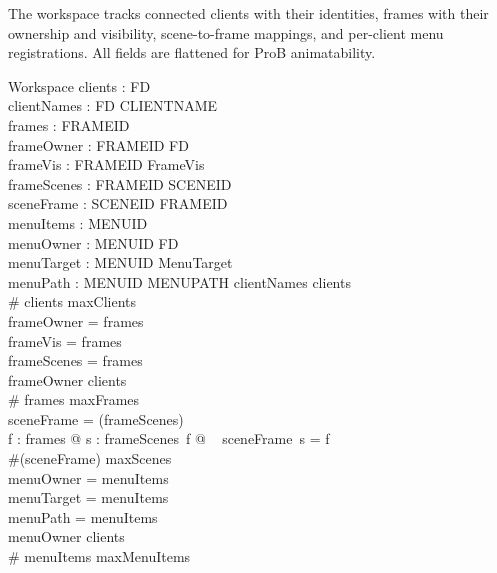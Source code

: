 \documentclass[a4paper,10pt,fleqn]{article}
\begin{document}
The workspace tracks connected clients with their identities,
frames with their ownership and visibility, scene-to-frame
mappings, and per-client menu registrations.  All fields are
flattened for ProB animatability.

\begin{schema}{Workspace}
  clients : \power FD \\
  clientNames : FD \pfun CLIENTNAME \\
  frames : \power FRAMEID \\
  frameOwner : FRAMEID \pfun FD \\
  frameVis : FRAMEID \pfun FrameVis \\
  frameScenes : FRAMEID \pfun \power SCENEID \\
  sceneFrame : SCENEID \pfun FRAMEID \\
  menuItems : \power MENUID \\
  menuOwner : MENUID \pfun FD \\
  menuTarget : MENUID \pfun MenuTarget \\
  menuPath : MENUID \pfun MENUPATH
  \where
  \dom clientNames \subseteq clients \\
  \# clients \leq maxClients \\
  \dom frameOwner = frames \\
  \dom frameVis = frames \\
  \dom frameScenes = frames \\
  \ran frameOwner \subseteq clients \\
  \# frames \leq maxFrames \\
  \dom sceneFrame = \bigcup (\ran frameScenes) \\
  \forall f : frames @ \forall s : frameScenes~f @
  \quad~ sceneFrame~s = f \\
  \#(\dom sceneFrame) \leq maxScenes \\
  \dom menuOwner = menuItems \\
  \dom menuTarget = menuItems \\
  \dom menuPath = menuItems \\
  \ran menuOwner \subseteq clients \\
  \# menuItems \leq maxMenuItems
\end{schema}
\end{document}
